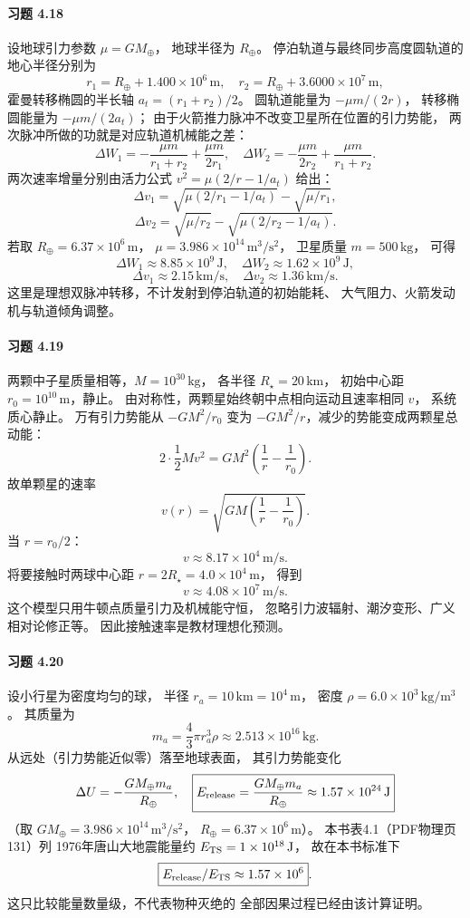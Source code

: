 \paragraph{习题 4.18}
设地球引力参数 \(\mu=GM_\oplus\)，
地球半径为 \(R_\oplus\)。
停泊轨道与最终同步高度圆轨道的地心半径分别为
\[
 r_1=R_\oplus+1.400\times10^6\,\mathrm m,\quad
 r_2=R_\oplus+3.6000\times10^7\,\mathrm m,
\]
霍曼转移椭圆的半长轴
\(a_t=(r_1+r_2)/2\)。
圆轨道能量为 \(-\mu m/(2r)\)，
转移椭圆能量为 \(-\mu m/(2a_t)\)；
由于火箭推力脉冲不改变卫星所在位置的引力势能，
两次脉冲所做的功就是对应轨道机械能之差：
\[
 \boxed{\Delta W_1=
 -\frac{\mu m}{r_1+r_2}+\frac{\mu m}{2r_1}},
\quad
 \boxed{\Delta W_2=
 -\frac{\mu m}{2r_2}+\frac{\mu m}{r_1+r_2}}.
\]
两次速率增量分别由活力公式
\(v^2=\mu(2/r-1/a_t)\) 给出：
\[
 \boxed{\Delta v_1=
 \sqrt{\mu(2/r_1-1/a_t)}-\sqrt{\mu/r_1}},
\]
\[
 \boxed{\Delta v_2=
 \sqrt{\mu/r_2}-\sqrt{\mu(2/r_2-1/a_t)}}.
\]
若取 \(R_\oplus=6.37\times10^6\,\mathrm m\)，
\(\mu=3.986\times10^{14}\,\mathrm{m^3/s^2}\)，
卫星质量 \(m=500\,\mathrm{kg}\)，
可得
\[
 \boxed{\Delta W_1\approx8.85\times10^9\,\mathrm J,\quad
 \Delta W_2\approx1.62\times10^9\,\mathrm J},
\]
\[
 \boxed{\Delta v_1\approx2.15\,\mathrm{km/s},\quad
 \Delta v_2\approx1.36\,\mathrm{km/s}}.
\]
这里是理想双脉冲转移，不计发射到停泊轨道的初始能耗、
大气阻力、火箭发动机与轨道倾角调整。

\paragraph{习题 4.19}
两颗中子星质量相等，\(M=10^{30}\,\mathrm{kg}\)，
各半径 \(R_\star=20\,\mathrm{km}\)，
初始中心距 \(r_0=10^{10}\,\mathrm m\)，静止。
由对称性，两颗星始终朝中点相向运动且速率相同 \(v\)，
系统质心静止。
万有引力势能从 \(-GM^2/r_0\)
变为 \(-GM^2/r\)，减少的势能变成两颗星总动能：
\[
 2\cdot\frac12 Mv^2
 =GM^2\left(\frac1r-\frac1{r_0}\right).
\]
故单颗星的速率
\[
 \boxed{v(r)=\sqrt{GM\left(\frac1r-\frac1{r_0}\right)}}.
\]
当 \(r=r_0/2\)：
\[
 \boxed{v\approx8.17\times10^4\,\mathrm{m/s}}.
\]
将要接触时两球中心距
\(r=2R_\star=4.0\times10^4\,\mathrm m\)，
得到
\[
 \boxed{v\approx4.08\times10^7\,\mathrm{m/s}}.
\]
这个模型只用牛顿点质量引力及机械能守恒，
忽略引力波辐射、潮汐变形、广义相对论修正等。
因此接触速率是教材理想化预测。

\paragraph{习题 4.20}
设小行星为密度均匀的球，
半径 \(r_a=10\,\mathrm{km}=10^4\,\mathrm m\)，
密度 \(\rho=6.0\times10^3\,\mathrm{kg/m^3}\)。
其质量为
\[
 m_a=\frac43\pi r_a^3\rho
 \approx2.513\times10^{16}\,\mathrm{kg}.
\]
从远处（引力势能近似零）落至地球表面，
其引力势能变化
\[
 \Delta U=-\frac{GM_\oplus m_a}{R_\oplus},
\quad
 \boxed{E_{\rm release}=\frac{GM_\oplus m_a}{R_\oplus}
 \approx1.57\times10^{24}\,\mathrm J}
\]
（取 \(GM_\oplus=3.986\times10^{14}\,\mathrm{m^3/s^2}\)，
\(R_\oplus=6.37\times10^6\,\mathrm m\)）。
本书表4.1（PDF物理页131）列
1976年唐山大地震能量约
\(E_{\rm TS}=1\times10^{18}\,\mathrm J\)，
故在本书标准下
\[
 \boxed{E_{\rm release}/E_{\rm TS}
 \approx1.57\times10^6}.
\]
这只比较能量数量级，不代表物种灭绝的
全部因果过程已经由该计算证明。

